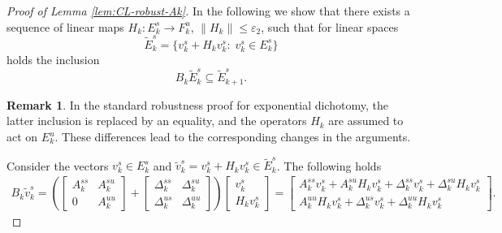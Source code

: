 \documentclass[12pt]{article}
\theoremstyle{definition}
\newtheorem{remark}[thm]{Remark}
\begin{document}
\begin{proof}[Proof of Lemma \ref{lem:CL-robust-Ak}]
In the following we show that there exists a sequence of linear maps
    $H_k: E_k^s \to F_k^u$, $\|H_k\| \leq \varepsilon_2$,
such that for linear spaces
\begin{equation}\label{eq:tildeEDef}
\tilde{E}_k^s = \{v_k^s+H_k v_k^s: \; v_k^s \in E_k^s\}    
\end{equation}
holds the inclusion
\begin{equation} \label{eq:ETildaIncl}
B_k \tilde{E}_k^s \subseteq \tilde{E}_{k+1}^s.    
\end{equation}
\begin{remark}
    In the standard robustness proof for exponential dichotomy, the latter inclusion is replaced by an equality, and the operators $H_k$ are assumed to act on $E_k^u$. These differences lead to the corresponding changes in the arguments.
\end{remark}
Consider the vectors $v_k^s \in E_k^s$ and $\tilde{v}_k^s = v_k^s + H_k v_k^s \in \tilde{E}_k^s$. The following holds
\begin{multline*}
    B_k \tilde{v}_k^s = \left(\begin{bmatrix}
A_k^{ss} & A_k^{su} \\
0 & A_k^{uu}
\end{bmatrix} 
+ \begin{bmatrix}
\Delta_k^{ss} & \Delta_k^{su} \\
\Delta_k^{us} & \Delta_k^{uu}
\end{bmatrix} 
\right)
\begin{bmatrix}
v_k^s  \\
H_k v_k^s  
\end{bmatrix} = 
\begin{bmatrix}
A_k^{ss}v_k^s + A_k^{su}H_kv_k^s + \Delta_{k}^{ss}v_k^s + \Delta_k^{su} H_k v_k^s  \\
A_k^{uu}H_kv_k^s + \Delta_k^{us}v_k^s + \Delta_k^{uu}H_k v_k^s
\end{bmatrix}.
\end{multline*}


\end{proof}
\end{document}
